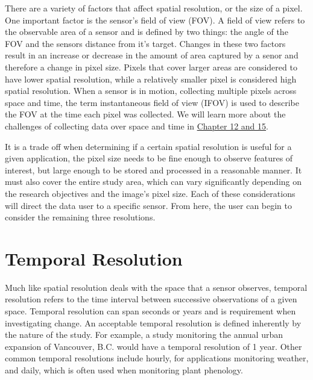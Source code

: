\documentclass[
]{book}
\begin{document}
There are a variety of factors that affect spatial resolution, or the
size of a pixel. One important factor is the sensor's field of view
(FOV). A field of view refers to the observable area of a sensor and is
defined by two things: the angle of the FOV and the sensors distance
from it's target. Changes in these two factors result in an increase or
decrease in the amount of area captured by a senor and therefore a
change in pixel size. Pixels that cover larger areas are considered to
have lower spatial resolution, while a relatively smaller pixel is
considered high spatial resolution. When a sensor is in motion,
collecting multiple pixels across space and time, the term instantaneous
field of view (IFOV) is used to describe the FOV at the time each pixel
was collected. We will learn more about the challenges of collecting
data over space and time in \href{https://ubc-geomatics-textbook.github.io/geomatics-textbook/remote-sensing-systems.html,https://ubc-geomatics-textbook.github.io/geomatics-textbook/LiDAR-acquisition-and-analysis.html}{Chapter 12 and 15}.

It is a trade off when determining if a certain spatial resolution is
useful for a given application, the pixel size needs to be fine enough
to observe features of interest, but large enough to be stored and
processed in a reasonable manner. It must also cover the entire study
area, which can vary significantly depending on the research objectives
and the image's pixel size. Each of these considerations will direct the
data user to a specific sensor. From here, the user can begin to
consider the remaining three resolutions.

\hypertarget{temporal-resolution}{%
\section{Temporal Resolution}\label{temporal-resolution}}

Much like spatial resolution deals with the space that a sensor
observes, temporal resolution refers to the time interval between
successive observations of a given space. Temporal resolution can span
seconds or years and is requirement when investigating change. An
acceptable temporal resolution is defined inherently by the nature of
the study. For example, a study monitoring the annual urban expansion of
Vancouver, B.C. would have a temporal resolution of 1 year. Other common
temporal resolutions include hourly, for applications monitoring
weather, and daily, which is often used when monitoring plant phenology.
\end{document}
